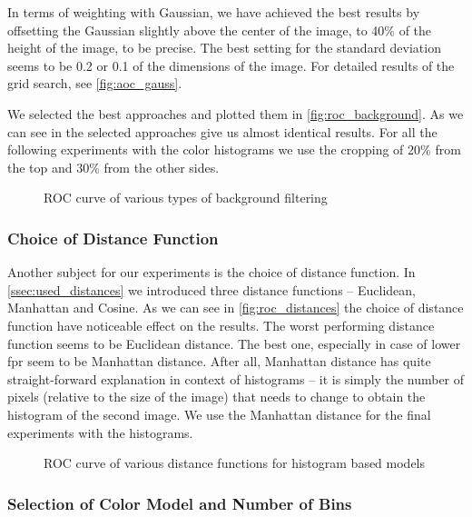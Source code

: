 In terms of weighting with Gaussian, we have achieved the best results
by offsetting the Gaussian slightly above the center of the image, to 40\%
of the height of the image, to be precise. The best setting for the standard deviation seems to be 0.2 or 0.1 of the dimensions of the image. For detailed results
of the grid search, see \autoref{fig:aoc_gauss}.

We selected the best approaches and plotted them in \autoref{fig:roc_background}. As we can see in the selected approaches give us almost identical results. For all the following experiments with the color histograms we use the cropping of 20\% from the top and 30\% from the other sides.

\begin{figure}
    \centering
    \def\svgwidth{\columnwidth}
    
    \caption{ROC curve of various types of background filtering}
    \label{fig:roc_background}
\end{figure}

\subsubsection{Choice of Distance Function}

Another subject for our experiments is the choice of distance function. In
\autoref{ssec:used_distances} we introduced three distance functions --
Euclidean, Manhattan and Cosine. As we can see in \autoref{fig:roc_distances}
the choice of distance function have noticeable effect on the results.
The worst performing distance function seems to be Euclidean distance. The best one,
especially in case of lower \gls{fpr} seem to be Manhattan distance.
After all, Manhattan distance has quite straight-forward explanation in context
of histograms -- it is simply the number of pixels (relative to the size of the image) that needs to change to obtain the histogram of the second image. We use the Manhattan distance for the final experiments with the histograms.

\begin{figure}
    \centering
    \def\svgwidth{\columnwidth}
    
    \caption{ROC curve of various distance functions for histogram based models}
    \label{fig:roc_distances}
\end{figure}

\subsubsection{Selection of Color Model and Number of Bins}

